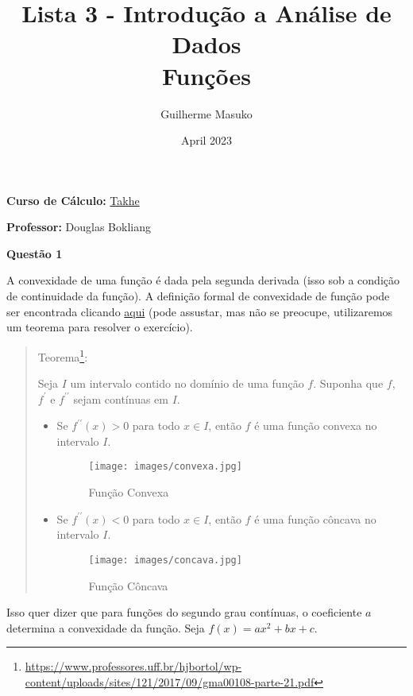 \documentclass[12pt, a4paper]{article}
\title{Lista 3 - Introdução a Análise de Dados \\
	Funções}
\author{Guilherme Masuko}
\date{April 2023}
\begin{document}
	
\clearpage
\maketitle
\thispagestyle{empty}

\textbf{Curso de Cálculo:} \href{https://cursos.takhe.com.br/}{Takhe}

\textbf{Professor:} Douglas Bokliang

\vspace{1cm}



\textbf{Questão 1}

A convexidade de uma função é dada pela segunda derivada (isso sob a condição de continuidade da função). A definição formal de convexidade de função pode ser encontrada clicando \href{https://pt.wikipedia.org/wiki/Fun\%C3\%A7\%C3\%A3o\_convexa}{aqui} (pode assustar, mas não se preocupe, utilizaremos um teorema para resolver o exercício).

\begin{quote}
	Teorema\footnote{\url{https://www.professores.uff.br/hjbortol/wp-content/uploads/sites/121/2017/09/gma00108-parte-21.pdf}}:
	
	Seja $I$ um intervalo contido no domínio de uma função $f$. Suponha que $f$, $f^{\prime}$ e $f^{\prime \prime}$ sejam contínuas em $I$. 
	
	\begin{itemize}
		\item Se $f^{\prime \prime} (x) > 0$ para todo $x \in I$, então $f$ é uma função convexa no intervalo $I$.
		
		\begin{figure}[h]
			\caption{Função Convexa}
			\centering
			\texttt{[image: images/convexa.jpg]}
			\label{fig:convexa}
		\end{figure}
	
	
		\item Se $f^{\prime \prime} (x) < 0$ para todo $x \in I$, então $f$ é uma função côncava no intervalo $I$.
		
		\begin{figure}[h]
			\caption{Função Côncava}
			\centering
			\texttt{[image: images/concava.jpg]}
			\label{fig:concava}
		\end{figure}
	\end{itemize}
\end{quote}

Isso quer dizer que para funções do segundo grau contínuas, o coeficiente $a$ determina a convexidade da função. Seja $f(x) = ax^2 + bx + c$.
\end{document}
